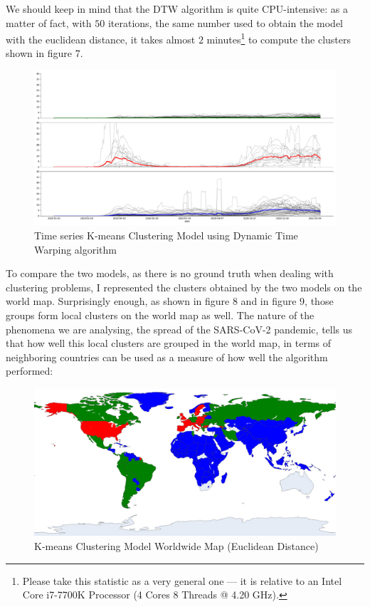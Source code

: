 \documentclass[11pt,a4paper]{article}
\begin{document}
We should keep in mind that the DTW algorithm is quite CPU-intensive: as a
matter of fact, with $50$ iterations, the same number used to obtain the model
with the euclidean distance, it takes almost $2$ minutes\footnote{Please take
this statistic as a very general one --- it is relative to an Intel Core
i7-7700K Processor (4 Cores 8 Threads @ 4.20 GHz).} to compute the clusters
shown in figure 7.
\begin{figure}[H]
    \begin{center}
        \includegraphics[scale=0.32]{img/daily-deaths-dtw-clusters.pdf}
    \end{center}
    \caption{Time series K-means Clustering Model using Dynamic Time Warping algorithm}
\end{figure}
\noindent
To compare the two models, as there is no ground truth when dealing with
clustering problems, I represented the clusters obtained by the two models on
the world map. Surprisingly enough, as shown in figure 8 and in figure 9,
those groups form local clusters on the world map as well. The nature of the
phenomena we are analysing, the spread of the SARS-CoV-2 pandemic, tells us that
how well this local clusters are grouped in the world map, in terms of
neighboring countries can be used as a measure of how well the algorithm
performed:
\begin{figure}[H]
    \begin{center}
        \includegraphics[scale=0.9]{img/euclidean-clusters-map.png}
    \end{center}
    \caption{K-means Clustering Model Worldwide Map (Euclidean Distance)}
\end{figure}
\end{document}
